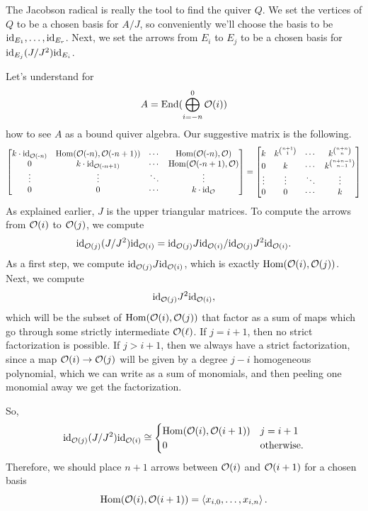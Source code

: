 \documentclass[12pt]{article}
\begin{document}
The Jacobson radical is really the tool to find the quiver $Q$. We set the vertices of $Q$ to be a chosen basis for $A/J$, so conveniently we'll choose the basis to be $\mathrm{id}_{E_1},\dots,\mathrm{id}_{E_r}$. Next, we set the arrows from $E_i$ to $E_j$ to be a chosen basis for $\mathrm{id}_{E_j} (J/J^2) \mathrm{id}_{E_i}$.

\begin{eg}
    Let's understand for
    \[A = \operatorname{End}(\bigoplus_{i=-n}^{0} \mathcal{O}(i))\]
    how to see $A$ as a bound quiver algebra. Our suggestive matrix is the following. 
    \[\begin{bmatrix}
        k\cdot \mathrm{id}_{\mathcal{O}(\text{-}n)} & \mathrm{Hom}(\mathcal{O}(\text{-}n),\mathcal{O}(\text{-}n+1)) & \cdots & \mathrm{Hom}(\mathcal{O}(\text{-}n),\mathcal{O})\\
        0 & k \cdot \mathrm{id}_{\mathcal{O}(\text{-}n+1)} & \cdots & \mathrm{Hom}(\mathcal{O}(\text{-}n+1),\mathcal{O})\\
        \vdots & \vdots & \ddots & \vdots\\
        0 & 0 & \cdots & k\cdot \mathrm{id}_{\mathcal{O}}
    \end{bmatrix}= \begin{bmatrix}
        k & k^{\binom{n+1}{1}} & \cdots & k^{\binom{n+n}{n}}\\
        0 & k & \cdots & k^{\binom{n+n-1}{n-1}}\\
        \vdots & \vdots & \ddots & \vdots\\
        0 & 0 & \cdots & k
    \end{bmatrix}\]
    As explained earlier, $J$ is the upper triangular matrices. To compute the arrows from $\mathcal{O}(i)$ to $\mathcal{O}(j)$, we compute
    \[\mathrm{id}_{\mathcal{O}(j)} (J/J^2) \mathrm{id}_{\mathcal{O}(i)} = \mathrm{id}_{\mathcal{O}(j)}J \mathrm{id}_{\mathcal{O}(i)}/ \mathrm{id}_{\mathcal{O}(j)} J^2 \mathrm{id}_{\mathcal{O}(i)}.\]
    As a first step, we compute $\mathrm{id}_{\mathcal{O}(j)} J \mathrm{id}_{\mathcal{O}(i)}$, which is exactly $\mathrm{Hom}(\mathcal{O}(i),\mathcal{O}(j))$. Next, we compute
    \[\mathrm{id}_{\mathcal{O}(j)} J^2 \mathrm{id}_{\mathcal{O}(i)},\]
    which will be the subset of $\mathrm{Hom}(\mathcal{O}(i),\mathcal{O}(j))$ that factor as a sum of maps which go through some strictly intermediate $\mathcal{O}(\ell)$. If $j=i+1$, then no strict factorization is possible. If $j>i+1$, then we always have a strict factorization, since a map $\mathcal{O}(i)\to \mathcal{O}(j)$ will be given by a degree $j-i$ homogeneous polynomial, which we can write as a sum of monomials, and then peeling one monomial away we get the factorization.

    So,
    \[\mathrm{id}_{\mathcal{O}(j)} (J/J^2) \mathrm{id}_{\mathcal{O}(i)} \cong \begin{cases}
        \mathrm{Hom}(\mathcal{O}(i), \mathcal{O}(i+1)) & j=i+1\\
        0 & \text{otherwise.}
    \end{cases}\]
    Therefore, we should place $n+1$ arrows between $\mathcal{O}(i)$ and $\mathcal{O}(i+1)$ for a chosen basis
    \[\mathrm{Hom}(\mathcal{O}(i),\mathcal{O}(i+1)) = \left\langle x_{i,0},\dots,x_{i,n}\right\rangle.\]


\end{eg}
\end{document}
